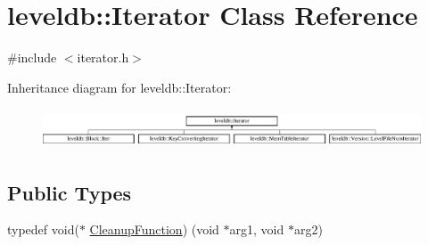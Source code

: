 \hypertarget{classleveldb_1_1_iterator}{}\section{leveldb\+:\+:Iterator Class Reference}
\label{classleveldb_1_1_iterator}


{\ttfamily \#include $<$iterator.\+h$>$}

Inheritance diagram for leveldb\+:\+:Iterator\+:\begin{figure}[H]
\begin{center}
\leavevmode
\includegraphics[height=1.196581cm]{classleveldb_1_1_iterator}
\end{center}
\end{figure}
\subsection*{Public Types}
\begin{DoxyCompactItemize}
\item 
typedef void($\ast$ \hyperlink{classleveldb_1_1_iterator_ae40c9eedd82a722d24fde1fd8bee4afa}{Cleanup\+Function}) (void $\ast$arg1, void $\ast$arg2)
\end{DoxyCompactItemize}
